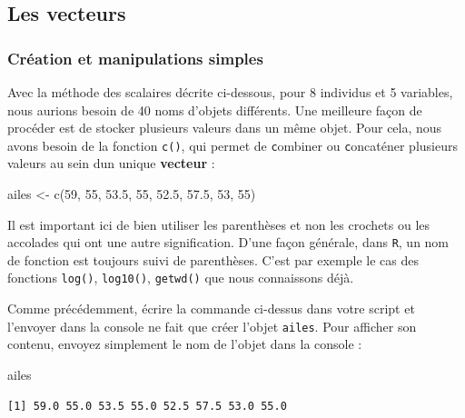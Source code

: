 \documentclass[
  a4paper,
  DIV=11,
  numbers=noendperiod,
  oneside]{scrreprt}
\newenvironment{Shaded}{}{}
\newcommand{\DecValTok}[1]{\textcolor[rgb]{0.00,0.36,0.77}{#1}}
\newcommand{\FloatTok}[1]{\textcolor[rgb]{0.00,0.36,0.77}{#1}}
\newcommand{\FunctionTok}[1]{\textcolor[rgb]{0.44,0.26,0.76}{#1}}
\newcommand{\NormalTok}[1]{\textcolor[rgb]{0.14,0.16,0.18}{#1}}
\newcommand{\OtherTok}[1]{\textcolor[rgb]{0.44,0.26,0.76}{#1}}
\begin{document}
\subsection{Les vecteurs}\label{sec-vectors}

\subsubsection{Création et manipulations
simples}\label{cruxe9ation-et-manipulations-simples}

Avec la méthode des scalaires décrite ci-dessous, pour 8 individus et 5
variables, nous aurions besoin de 40 noms d'objets différents. Une
meilleure façon de procéder est de stocker plusieurs valeurs dans un
même objet. Pour cela, nous avons besoin de la fonction \texttt{c()},
qui permet de \texttt{c}ombiner ou \texttt{c}oncaténer plusieurs valeurs
au sein dun unique \textbf{vecteur} :

\begin{Shaded}
\begin{Highlighting}[]
\NormalTok{ailes }\OtherTok{\textless{}{-}} \FunctionTok{c}\NormalTok{(}\DecValTok{59}\NormalTok{, }\DecValTok{55}\NormalTok{, }\FloatTok{53.5}\NormalTok{, }\DecValTok{55}\NormalTok{, }\FloatTok{52.5}\NormalTok{, }\FloatTok{57.5}\NormalTok{, }\DecValTok{53}\NormalTok{, }\DecValTok{55}\NormalTok{)}
\end{Highlighting}
\end{Shaded}

Il est important ici de bien utiliser les parenthèses et non les
crochets ou les accolades qui ont une autre signification. D'une façon
générale, dans \texttt{R}, un nom de fonction est toujours suivi de
parenthèses. C'est par exemple le cas des fonctions \texttt{log()},
\texttt{log10()}, \texttt{getwd()} que nous connaissons déjà.

Comme précédemment, écrire la commande ci-dessus dans votre script et
l'envoyer dans la console ne fait que créer l'objet \texttt{ailes}. Pour
afficher son contenu, envoyez simplement le nom de l'objet dans la
console :

\begin{Shaded}
\begin{Highlighting}[]
\NormalTok{ailes}
\end{Highlighting}
\end{Shaded}

\begin{verbatim}
[1] 59.0 55.0 53.5 55.0 52.5 57.5 53.0 55.0
\end{verbatim}
\end{document}
